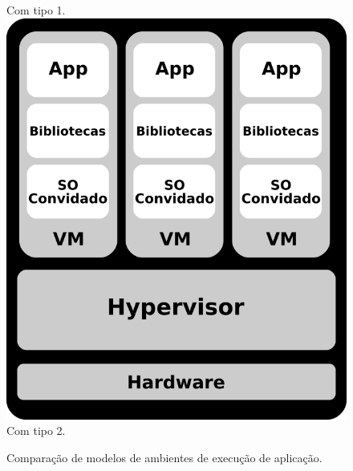 \begin{figure}[tb]
	\centering
	
    \caption{Comparação de modelos de ambientes de execução de aplicação.}%
                   {Com \hypervisor tipo 1.}
                   {\includegraphics[width=\textwidth]{content/images/vmvscont-1.png}}
	\qquad
                   {Com \hypervisor tipo 2.}

\end{figure}
